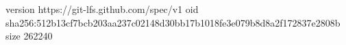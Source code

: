 version https://git-lfs.github.com/spec/v1
oid sha256:512b13cf7bcb203aa237c02148d30bb17b1018fe3e079b8d8a2f172837e2808b
size 262240

